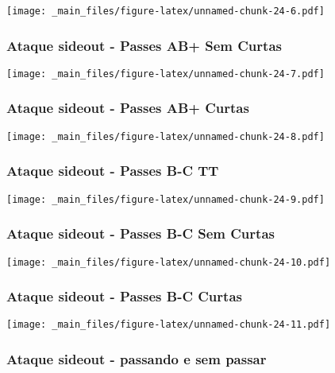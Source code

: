 \documentclass[
]{book}
\begin{document}
\texttt{[image: \_main\_files/figure-latex/unnamed-chunk-24-6.pdf]}

\subsubsection*{Ataque sideout - Passes AB+ Sem Curtas}\label{ataque-sideout---passes-ab-sem-curtas}

\texttt{[image: \_main\_files/figure-latex/unnamed-chunk-24-7.pdf]}

\subsubsection*{Ataque sideout - Passes AB+ Curtas}\label{ataque-sideout---passes-ab-curtas}

\texttt{[image: \_main\_files/figure-latex/unnamed-chunk-24-8.pdf]}

\subsubsection{Ataque sideout - Passes B-C TT}\label{ataque-sideout---passes-b-c-tt}

\texttt{[image: \_main\_files/figure-latex/unnamed-chunk-24-9.pdf]}

\subsubsection*{Ataque sideout - Passes B-C Sem Curtas}\label{ataque-sideout---passes-b-c-sem-curtas}

\texttt{[image: \_main\_files/figure-latex/unnamed-chunk-24-10.pdf]}

\subsubsection*{Ataque sideout - Passes B-C Curtas}\label{ataque-sideout---passes-b-c-curtas}

\texttt{[image: \_main\_files/figure-latex/unnamed-chunk-24-11.pdf]}

\subsubsection*{Ataque sideout - passando e sem passar}\label{ataque-sideout---passando-e-sem-passar}
\end{document}
